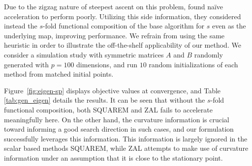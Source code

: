 \documentclass{statsoc}
\begin{document}
\begin{table}
\caption{\label{tab:gen_eigen}
Generalized eigenvalues: number of $F(x)$ evaluations, runtime, and eigenvalues at convergence.}%

\centering
{}
\end{table}


Due to the zigzag nature of steepest ascent on this problem, \cite{zhou2011quasi} found na\"ive acceleration to perform poorly. Utilizing this side information, they considered instead the $s$-fold functional composition of the base algorithm for $s$ even as the underlying map, improving performance. We refrain from using the same heuristic in order to illustrate the  off-the-shelf applicability of our method. %
We consider a simulation study with symmetric matrices $A$ and $B$ randomly generated with $p=100$ dimensions, and run $10$ random initializations of each method from matched initial points.  %

 Figure~\ref{fig:eigen-sp} displays objective values at convergence, and Table \ref{tab:gen_eigen} details the results. It can be seen that without the $s$-fold functional composition, both SQUAREM and ZAL fails to accelerate meaningfully here. On the other hand, the curvature information is crucial toward informing a good search direction in such cases, and our formulation successfully leverages this information. %
 This information is largely ignored in the scalar based methods SQUAREM, while ZAL attempts to make use of curvature information under an assumption that it is close to the stationary point. 
\end{document}
